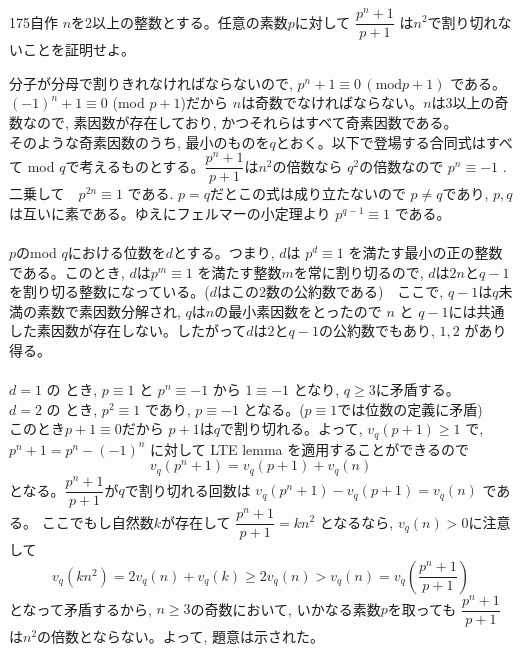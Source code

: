 \begin{prob}{175}{}{自作}
 $n$を2以上の整数とする。任意の素数$p$に対して $\dfrac{p^n+1}{p+1}$ は$n^2$で割り切れないことを証明せよ。
\end{prob}

分子が分母で割りきれなければならないので, $p^n+1\equiv 0 \, (\mbox{mod} p+1)$ である。$(-1)^n+1\equiv 0$ (mod  $p+1$)だから $n$は奇数でなければならない。$n$は3以上の奇数なので, 素因数が存在しており, かつそれらはすべて奇素因数である。\\
そのような奇素因数のうち, 最小のものを$q$とおく。以下で登場する合同式はすべて mod $q$で考えるものとする。$\dfrac{p^n+1}{p+1}$は$n^2$の倍数なら $q^2$の倍数なので $p^n\equiv -1$ . 二乗して　$p^{2n}\equiv 1$  である. $p=q$だとこの式は成り立たないので $p\neq q$であり, $p,q$は互いに素である。ゆえにフェルマーの小定理より $p^{q-1}\equiv 1$ である。\\
\\
$p$のmod $q$における位数を$d$とする。つまり, $d$は $p^d\equiv 1$ を満たす最小の正の整数である。このとき, $d$は$p^m\equiv 1$  を満たす整数$m$を常に割り切るので, $d$は$2n$と$q-1$ を割り切る整数になっている。($d$はこの2数の公約数である)　ここで, $q-1$は$q$未満の素数で素因数分解され, $q$は$n$の最小素因数をとったので $n$ と $q-1$には共通した素因数が存在しない。したがって$d$は$2$と$q-1$の公約数でもあり, $1,2$ があり得る。\\
\\
$d=1$ の とき, $p\equiv 1$ と $p^n\equiv -1$ から $1\equiv -1$ となり, $q\geq 3$に矛盾する。\\
$d=2$ の とき, $p^2\equiv 1$ であり,  $p\equiv -1$ となる。($p\equiv 1$では位数の定義に矛盾)\\
このとき$p+1\equiv 0$だから $p+1$は$q$で割り切れる。よって, $v_{q}(p+1)\geq 1$ で, $p^n+1=p^n-(-1)^n$ に対して LTE lemma を適用することができるので
\[v_q(p^n+1)=v_q(p+1)+v_q(n)\]
となる。$\dfrac{p^n+1}{p+1}$が$q$で割り切れる回数は $v_q{(p^n+1)}-v_q(p+1)=v_q(n)$ である。 ここでもし自然数$k$が存在して $\dfrac{p^n+1}{p+1}=kn^2$ となるなら, $v_q(n)>0$に注意して
\[v_q(kn^2)=2v_q(n)+v_q(k)\geq 2v_q(n)>v_q(n)=v_q\left(\dfrac{p^n+1}{p+1}\right)\]
となって矛盾するから, $n\geq 3$の奇数において, いかなる素数$p$を取っても $\dfrac{p^n+1}{p+1}$は$n^2$の倍数とならない。よって, 題意は示された。

